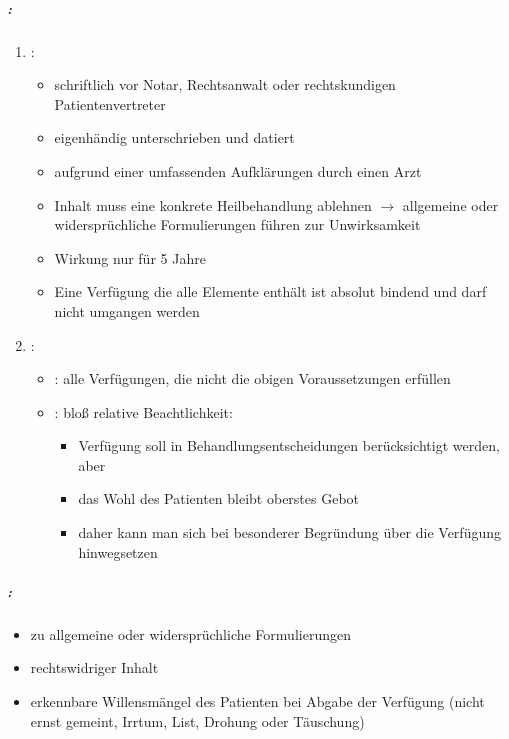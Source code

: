 \subparagraph{:}

\begin{enumerate}
  \item {}:
  \begin{itemize}
    \item schriftlich vor Notar, Rechtsanwalt oder rechtskundigen
    Patientenvertreter
    \item eigenhändig unterschrieben und datiert
    \item aufgrund einer umfassenden Aufklärungen durch einen Arzt
    \item Inhalt muss eine konkrete Heilbehandlung ablehnen ${\rightarrow}$ allgemeine oder
    widersprüchliche Formulierungen führen zur Unwirksamkeit
    \item Wirkung nur für 5 Jahre
    \item Eine Verfügung die alle Elemente enthält ist absolut bindend und
    darf nicht umgangen werden
  \end{itemize}
  \item {}:
  \begin{itemize}
    \item
    : alle Verfügungen, die nicht
    die obigen Voraussetzungen erfüllen
    \item
    : bloß relative
    Beachtlichkeit:
    \begin{itemize}
      \item
      Verfügung soll in Behandlungsentscheidungen berücksichtigt werden,
      aber
      \item
      das Wohl des Patienten bleibt oberstes Gebot
      \item
      daher kann man sich bei besonderer Begründung über die Verfügung
      hinwegsetzen
    \end{itemize}
  \end{itemize}
\end{enumerate}

\subparagraph{:}

\begin{itemize}
  \item zu allgemeine oder widersprüchliche Formulierungen
  \item rechtswidriger Inhalt
  \item erkennbare Willensmängel des Patienten bei Abgabe der
  Verfügung (nicht ernst gemeint, Irrtum, List, Drohung oder Täuschung)
\end{itemize}


